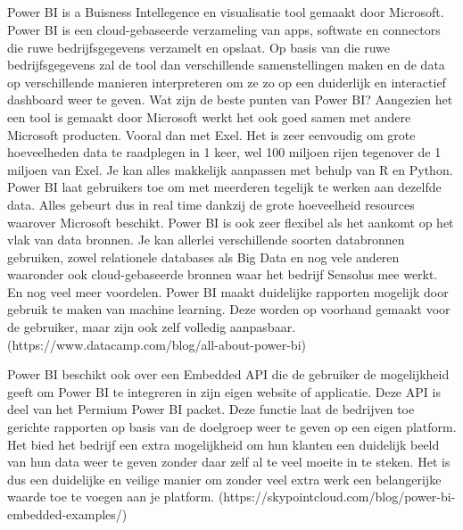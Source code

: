 \subsection{}%
\label{sec:powerBI}
Power BI is a Buisness Intellegence en visualisatie tool gemaakt door Microsoft. Power BI is een cloud-gebaseerde verzameling van apps, softwate en connectors die ruwe bedrijfsgegevens verzamelt en opslaat. Op basis van die ruwe bedrijfsgegevens zal de tool dan verschillende samenstellingen maken en de data op verschillende manieren interpreteren om ze zo op een duiderlijk en interactief dashboard weer te geven. Wat zijn de beste punten van Power BI? Aangezien het een tool is gemaakt door Microsoft werkt het ook goed samen met andere Microsoft producten. Vooral dan met Exel. Het is zeer eenvoudig om grote hoeveelheden data te raadplegen in 1 keer, wel 100 miljoen rijen tegenover de 1 miljoen van Exel. Je kan alles makkelijk aanpassen met behulp van R en Python. Power BI laat gebruikers toe om met meerderen tegelijk te werken aan dezelfde data. Alles gebeurt dus in real time dankzij de grote hoeveelheid resources waarover Microsoft beschikt. Power BI is ook zeer flexibel als het aankomt op het vlak van data bronnen. Je kan allerlei verschillende soorten databronnen gebruiken, zowel relationele databases als Big Data en nog vele anderen waaronder ook cloud-gebaseerde bronnen waar het bedrijf Sensolus mee werkt. En nog veel meer voordelen. Power BI maakt duidelijke rapporten mogelijk door gebruik te maken van machine learning. Deze worden op voorhand gemaakt voor de gebruiker, maar zijn ook zelf volledig aanpasbaar.
(https://www.datacamp.com/blog/all-about-power-bi)

Power BI beschikt ook over een Embedded API die de gebruiker de mogelijkheid geeft om Power BI te integreren in zijn eigen website of applicatie. Deze API is deel van het Permium Power BI packet. Deze functie laat de bedrijven toe gerichte rapporten op basis van de doelgroep weer te geven op een eigen platform. Het bied het bedrijf een extra mogelijkheid om hun klanten een duidelijk beeld van hun data weer te geven zonder daar zelf al te veel moeite in te steken. Het is dus een duidelijke en veilige manier om zonder veel extra werk een belangerijke waarde toe te voegen aan je platform.
(https://skypointcloud.com/blog/power-bi-embedded-examples/)

